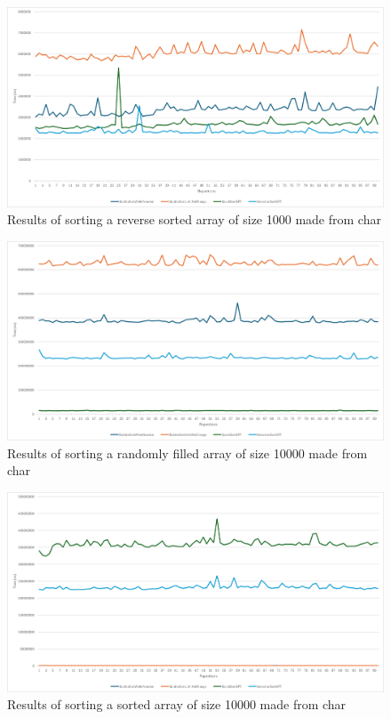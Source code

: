 \documentclass{article}
\begin{document}
\begin{figure}[!h]
    \centering
    \includegraphics[width=0.7\linewidth]{char_1000_reverse_sorted.png}
    \caption{Results of sorting a reverse sorted array of size 1000 made from char}
    \label{fig:char_1000_reverse_sorted}
\end{figure}

\begin{figure}[!h]
    \centering
    \includegraphics[width=0.7\linewidth]{char_10000_random.png}
    \caption{Results of sorting a randomly filled array of size 10000 made from char}
    \label{fig:char_10000_random}
\end{figure}

\begin{figure}[!h]
    \centering
    \includegraphics[width=0.7\linewidth]{char_10000_sorted.png}
    \caption{Results of sorting a sorted array of size 10000 made from char}
    \label{fig:char_10000_sorted}
\end{figure}
\end{document}

